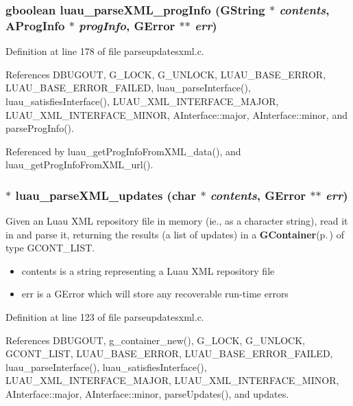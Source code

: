 \subsubsection{\setlength{\rightskip}{0pt plus 5cm}gboolean luau\_\-parse\-XML\_\-prog\-Info (GString $\ast$ {\em contents}, {\bf AProg\-Info} $\ast$ {\em prog\-Info}, GError $\ast$$\ast$ {\em err})}\label{parseupdatesxml_8c_a32}




Definition at line 178 of file parseupdatesxml.c.

References DBUGOUT, G\_\-LOCK, G\_\-UNLOCK, LUAU\_\-BASE\_\-ERROR, LUAU\_\-BASE\_\-ERROR\_\-FAILED, luau\_\-parse\-Interface(), luau\_\-satisfies\-Interface(), LUAU\_\-XML\_\-INTERFACE\_\-MAJOR, LUAU\_\-XML\_\-INTERFACE\_\-MINOR, AInterface::major, AInterface::minor, and parse\-Prog\-Info().

Referenced by luau\_\-get\-Prog\-Info\-From\-XML\_\-data(), and luau\_\-get\-Prog\-Info\-From\-XML\_\-url().
\subsubsection{$\ast$ luau\_\-parse\-XML\_\-updates (char $\ast$ {\em contents}, GError $\ast$$\ast$ {\em err})}\label{parseupdatesxml_8c_a31}


Given an Luau XML repository file in memory (ie., as a character string), read it in and parse it, returning the results (a list of updates) in a {\bf GContainer}{\rm (p.\,\pageref{structGContainer})} of type GCONT\_\-LIST.

\begin{itemize}
\item contents is a string representing a Luau XML repository file \item err is a GError which will store any recoverable run-time errors 
\end{itemize}


Definition at line 123 of file parseupdatesxml.c.

References DBUGOUT, g\_\-container\_\-new(), G\_\-LOCK, G\_\-UNLOCK, GCONT\_\-LIST, LUAU\_\-BASE\_\-ERROR, LUAU\_\-BASE\_\-ERROR\_\-FAILED, luau\_\-parse\-Interface(), luau\_\-satisfies\-Interface(), LUAU\_\-XML\_\-INTERFACE\_\-MAJOR, LUAU\_\-XML\_\-INTERFACE\_\-MINOR, AInterface::major, AInterface::minor, parse\-Updates(), and updates.

